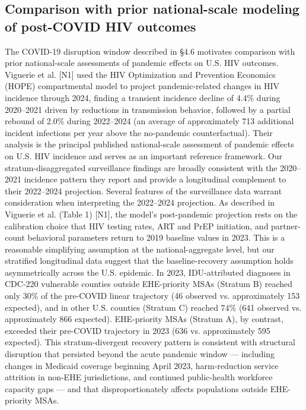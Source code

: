 \documentclass[11pt]{article}
\begin{document}
\subsection{Comparison with prior national-scale modeling of post-COVID HIV outcomes}

The COVID-19 disruption window described in §4.6 motivates comparison with prior national-scale assessments of pandemic effects on U.S. HIV outcomes. Viguerie et al. [N1] used the HIV Optimization and Prevention Economics (HOPE) compartmental model to project pandemic-related changes in HIV incidence through 2024, finding a transient incidence decline of 4.4\% during 2020–2021 driven by reductions in transmission behavior, followed by a partial rebound of 2.0\% during 2022–2024 (an average of approximately 713 additional incident infections per year above the no-pandemic counterfactual). Their analysis is the principal published national-scale assessment of pandemic effects on U.S. HIV incidence and serves as an important reference framework. Our stratum-disaggregated surveillance findings are broadly consistent with the 2020–2021 incidence pattern they report and provide a longitudinal complement to their 2022–2024 projection.
Several features of the surveillance data warrant consideration when interpreting the 2022–2024 projection. As described in Viguerie et al. (Table 1) [N1], the model's post-pandemic projection rests on the calibration choice that HIV testing rates, ART and PrEP initiation, and partner-count behavioral parameters return to 2019 baseline values in 2023. This is a reasonable simplifying assumption at the national-aggregate level, but our stratified longitudinal data suggest that the baseline-recovery assumption holds asymmetrically across the U.S. epidemic. In 2023, IDU-attributed diagnoses in CDC-220 vulnerable counties outside EHE-priority MSAs (Stratum B) reached only 30\% of the pre-COVID linear trajectory (46 observed vs. approximately 153 expected), and in other U.S. counties (Stratum C) reached 74\% (641 observed vs. approximately 866 expected). EHE-priority MSAs (Stratum A), by contrast, exceeded their pre-COVID trajectory in 2023 (636 vs. approximately 595 expected). This stratum-divergent recovery pattern is consistent with structural disruption that persisted beyond the acute pandemic window — including changes in Medicaid coverage beginning April 2023, harm-reduction service attrition in non-EHE jurisdictions, and continued public-health workforce capacity gaps — and that disproportionately affects populations outside EHE-priority MSAs.
\end{document}
